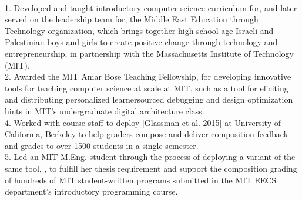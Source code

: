 \documentclass[11pt]{article}
\begin{document}
\\


1. Developed and taught introductory computer science curriculum for, and later served on the leadership team for, the Middle East Education through Technology organization, which brings together high-school-age Israeli and Palestinian boys and girls to create positive change through technology and entrepreneurship, in partnership with the Massachusetts Institute of Technology (MIT).\\[2pt]
2. Awarded the MIT Amar Bose Teaching Fellowship, for developing innovative tools for teaching computer science at scale at MIT, such as a tool for eliciting and distributing personalized learnersourced debugging and design optimization hints in MIT's undergraduate digital architecture class.\\[2pt]
4. Worked with course staff to deploy  [Glassman et al. 2015] at University of California, Berkeley to help graders compose and deliver composition feedback and grades to over 1500 students in a single semester.\\[2pt]
5. Led an MIT M.Eng. student through the process of deploying a variant of the same tool, , to fulfill her thesis requirement and support the composition grading of hundreds of MIT student-written programs submitted in the MIT EECS department's introductory programming course.\\[2pt]
\end{document}
